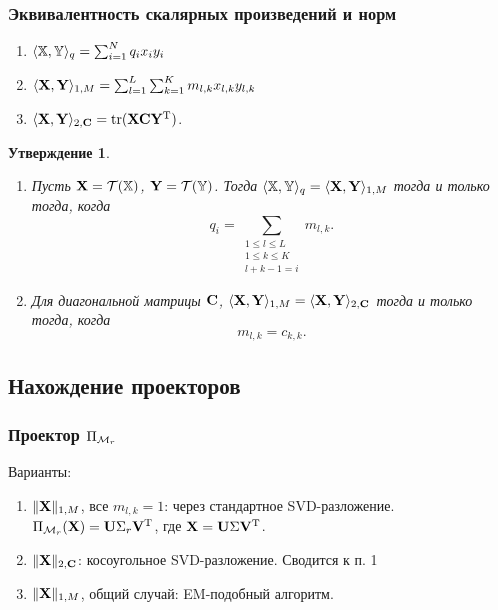 \documentclass[unicode, notheorems]{beamer}
\newtheorem{proposition}{Утверждение}
\begin{document}
\begin{frame}
	\frametitle{Эквивалентность скалярных произведений и норм}
	\begin{enumerate}
		\item $\langle \mathbb{X}, \mathbb{Y} \rangle_q = \sum_{i=1}^N q_i x_i  y_i$
		\item $\langle\mathbf{X}, \mathbf{Y} \rangle_{1, M} = \sum_{l = 1}^L \sum_{k = 1}^K m_{l, k} x_{l, k} y_{l, k}$
		\item $\langle\mathbf{X}, \mathbf{Y}\rangle_{2, \mathbf{C}} = \text{tr}(\mathbf{X} \mathbf{C} \mathbf{Y}^{\mathrm{T}})$.
	\end{enumerate}
	\begin{proposition}
		\small
	    \begin{enumerate}
		\item Пусть $\mathbf{X} = \mathcal{T}(\mathbb{X})$,  $\mathbf{Y} = \mathcal{T}(\mathbb{Y})$. Тогда $\langle\mathbb{X},\mathbb{Y}\rangle_q= \langle\mathbf{X},\mathbf{Y}\rangle_{1, M}$ тогда и только тогда, когда
		\begin{equation*}
		q_i = \sum_{\substack{1 \le l \le L \\ 1 \le k \le K \\ l+k-1=i}} m_{l,k}.
		\end{equation*}
		
		\item Для диагональной матрицы $\mathbf{C}$, $\langle \mathbf{X},\mathbf{Y} \rangle_{1, M}= \langle \mathbf{X},\mathbf{Y} \rangle_{2, \mathbf{C}}$ тогда и только тогда, когда
		\begin{equation*}
		m_{l,k}=c_{k,k}.
		\end{equation*}
	    \end{enumerate}
	\end{proposition}
	
\end{frame}

\subsection{Нахождение проекторов}
\begin{frame}
	\frametitle{Проектор $\Pi_{\mathcal{M}_r}$}
	Варианты:
	\begin{enumerate}
		\item $\|\mathbf{X}\|_{1, M}$, все $m_{l, k} = 1$: через стандартное SVD-разложение. $\Pi_{\mathcal{M}_r}(\mathbf{X}) = \mathbf{U} \Sigma_r \mathbf{V}^{\mathrm{T}}$, где $\mathbf{X} = \mathbf{U} \Sigma \mathbf{V}^{\mathrm{T}}$.
		
		\vspace{0.2cm}
		\item $\|\mathbf{X}\|_{2, \mathbf{C}}$: косоугольное SVD-разложение. Сводится к п. 1
		
		\vspace{0.2cm}
		\item $\|\mathbf{X}\|_{1, M}$, общий случай: EM-подобный алгоритм.

	\end{enumerate}
\end{frame}
\end{document}
